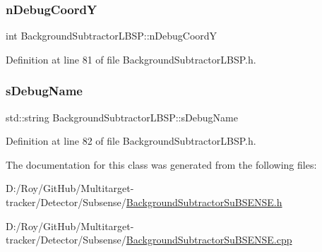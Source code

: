 \mbox{\label{class_background_subtractor_l_b_s_p_a8e1451fd90eb4459aa84ea5e7133268a}} 
\subsubsection{\texorpdfstring{n\+Debug\+CoordY}{nDebugCoordY}}
{\footnotesize\ttfamily int Background\+Subtractor\+L\+B\+S\+P\+::n\+Debug\+CoordY\hspace{0.3cm}{\ttfamily [inherited]}}



Definition at line 81 of file Background\+Subtractor\+L\+B\+S\+P.\+h.

\mbox{\label{class_background_subtractor_l_b_s_p_ada55b4a5eec8c82d0e05b0f9f1600ecb}} 
\subsubsection{\texorpdfstring{s\+Debug\+Name}{sDebugName}}
{\footnotesize\ttfamily std\+::string Background\+Subtractor\+L\+B\+S\+P\+::s\+Debug\+Name\hspace{0.3cm}{\ttfamily [inherited]}}



Definition at line 82 of file Background\+Subtractor\+L\+B\+S\+P.\+h.



The documentation for this class was generated from the following files\+:\begin{DoxyCompactItemize}
\item 
D\+:/\+Roy/\+Git\+Hub/\+Multitarget-\/tracker/\+Detector/\+Subsense/\mbox{\hyperlink{_background_subtractor_su_b_s_e_n_s_e_8h}{Background\+Subtractor\+Su\+B\+S\+E\+N\+S\+E.\+h}}\item 
D\+:/\+Roy/\+Git\+Hub/\+Multitarget-\/tracker/\+Detector/\+Subsense/\mbox{\hyperlink{_background_subtractor_su_b_s_e_n_s_e_8cpp}{Background\+Subtractor\+Su\+B\+S\+E\+N\+S\+E.\+cpp}}\end{DoxyCompactItemize}
